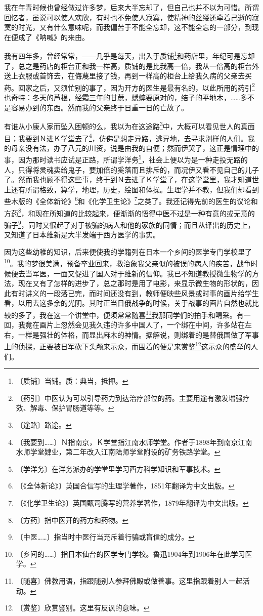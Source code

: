 \documentclass[12pt,UTF-8,openany]{ctexbook}
\begin{document}
\begin{large}
    
    我在年青时候也曾经做过许多梦，后来大半忘却了，但自己也并不以为可惜。所谓回忆者，虽说可以使人欢欣，有时也不免使人寂寞，使精神的丝缕还牵着己逝的寂寞的时光，又有什么意味呢，而我偏苦于不能全忘却，这不能全忘的一部分，到现在便成了《呐喊》的来由。
    
    我有四年多，曾经常常，——几乎是每天，出入于质铺\footnote{〔质铺〕当铺。质：典当，抵押。}和药店里，年纪可是忘却了，总之是药店的柜台正和我一样高，质铺的是比我高一倍，我从一倍高的柜台外送上衣服或首饰去，在侮蔑里接了钱，再到一样高的柜台上给我久病的父亲去买药。回家之后，又须忙别的事了，因为开方的医生是最有名的，以此所用的药引\footnote{〔药引〕中医认为可以引导药力到达治疗部位的药。主要用途有激发增强疗效、解毒、保护胃肠道等等。}也奇特：冬天的芦根，经霜三年的甘蔗，蟋蟀要原对的，结子的平地木，……多不是容易办到的东西。然而我的父亲终于日重一日的亡故了。
    
    有谁从小康人家而坠入困顿的么，我以为在这途路\footnote{〔途路〕路途。}中，大概可以看见世人的真面目；我要到Ｎ进Ｋ学堂去了\footnote{〔我要到……〕Ｎ指南京，Ｋ学堂指江南水师学堂。作者于1898年到南京江南水师学堂肄业，第二年改入江南陆师学堂附设的矿务铁路学堂。}，仿佛是想走异路，逃异地，去寻求别样的人们。我的母亲没有法，办了八元的川资，说是由我的自便；然而伊哭了，这正是情理中的事，因为那时读书应试是正路，所谓学洋务\footnote{〔学洋务〕在洋务派办的学堂里学习西方科学知识和军事技术。}，社会上便以为是一种走投无路的人，只得将灵魂卖给鬼子，要加倍的奚落而且排斥的，而况伊又看不见自己的儿子了。然而我也顾不得这些事，终于到Ｎ去进了Ｋ学堂了，在这学堂里，我才知道世上还有所谓格致，算学，地理，历史，绘图和体操。生理学并不教，但我们却看到些木版的《全体新论》\footnote{〔《全体新论》〕英国合信写的生理学著作，1851年翻译为中文出版。}和《化学卫生论》\footnote{〔《化学卫生论》〕英国甄司腾写的营养学著作，1879年翻译为中文出版。}之类了。我还记得先前的医生的议论和方药\footnote{〔方药〕指中医开的药方和药物。}，和现在所知道的比较起来，便渐渐的悟得中医不过是一种有意的或无意的骗子\footnote{〔中医……〕指当时中医行当充斥着行骗或盲信的成分。}，同时又很起了对于被骗的病人和他的家族的同情；而且从译出的历史上，又知道了日本维新是大半发端于西方医学的事实。
    
    因为这些幼稚的知识，后来便使我的学籍列在日本一个乡间的医学专门学校里了\footnote{〔乡间的……〕指日本仙台的医学专门学校。鲁迅1904年到1906年在此学习医学。}。我的梦很美满，预备卒业回来，救治象我父亲似的被误的病人的疾苦，战争时候便去当军医，一面又促进了国人对于维新的信仰。我已不知道教授微生物学的方法，现在又有了怎样的进步了，总之那时是用了电影，来显示微生物的形状的，因此有时讲义的一段落已完，而时间还没有到，教师便映些风景或时事的画片给学生看，以用去这多余的光阴。其时正当日俄战争的时候，关于战事的画片自然也就比较的多了，我在这一个讲堂中，便须常常随喜\footnote{〔随喜〕佛教用语，指跟随别人参拜佛殿或做善事。这里指跟着别人一起活动。}我那同学们的拍手和喝采。有一回，我竟在画片上忽然会见我久违的许多中国人了，一个绑在中间，许多站在左右，一样是强壮的体格，而显出麻木的神情。据解说，则绑着的是替俄国做了军事上的侦探，正要被日军砍下头颅来示众，而围着的便是来赏鉴\footnote{〔赏鉴〕欣赏鉴别。这里有反讽的意味。}这示众的盛举的人们。
    

\end{large}
\end{document}

